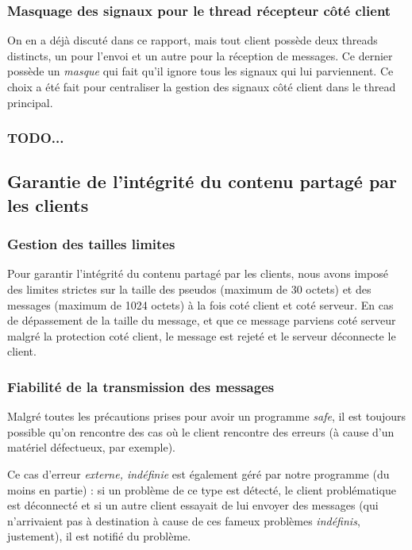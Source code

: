 \documentclass{article}
\begin{document}
\subsubsection{Masquage des signaux pour le thread récepteur côté client}
 On en a déjà discuté dans ce rapport, mais tout client possède deux threads distincts, un pour l'envoi et un autre pour la réception de messages. Ce dernier possède un \textit{masque} qui fait qu'il ignore tous les signaux qui lui parviennent. Ce choix a été fait pour centraliser la gestion des signaux côté client dans le thread principal.

\subsubsection{TODO...}


\subsection{Garantie de l'intégrité du contenu partagé par les clients}

\subsubsection{Gestion des tailles limites}

Pour garantir l'intégrité du contenu partagé par les clients, nous avons imposé des limites strictes sur la taille des pseudos (maximum de 30 octets) et des messages (maximum de 1024 octets) à la fois coté client et coté serveur. En cas de dépassement de la taille du message, et que ce message parviens coté serveur malgré la protection coté client, le message est rejeté et le serveur déconnecte le client. 

\subsubsection{Fiabilité de la transmission des messages}

Malgré toutes les précautions prises pour avoir un programme \textit{safe}, il est toujours possible qu'on rencontre des cas où le client rencontre des erreurs (à cause d'un matériel défectueux, par exemple). 

Ce cas d'erreur \textit{externe, indéfinie} est également géré par notre programme (du moins en partie) : si un problème de ce type est détecté, le client problématique est déconnecté et si un autre client essayait de lui envoyer des messages (qui n'arrivaient pas à destination à cause de ces fameux problèmes \textit{indéfinis}, justement), il est notifié du problème.
\end{document}
